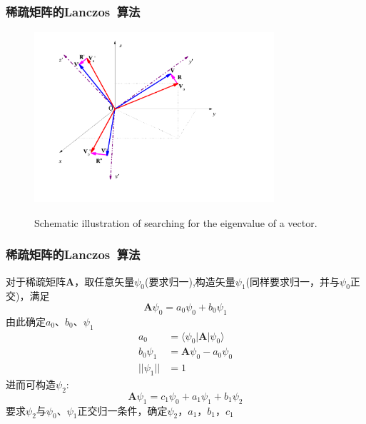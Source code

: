 \documentclass[cjk,slidestop,compress,mathserif,blue]{beamer}
\begin{document}
\frame
{
	\frametitle{稀疏矩阵的\textrm{Lanczos~}算法}
\begin{figure}[h!]
\centering
\includegraphics[height=2.5in,width=3.5in,viewport=0 0 850 590,clip]{Figures/Coordinate_transformation.png}
\label{decent_CG}
\caption{\tiny \textrm{Schematic illustration of searching for the eigenvalue of a vector.}}%
\end{figure}
}

\frame
{
	\frametitle{稀疏矩阵的\textrm{Lanczos~}算法}
	对于稀疏矩阵$\mathbf{A}$，取任意矢量$\psi_0$(要求归一),构造矢量$\psi_1$(同样要求归一，并与$\psi_0$正交)，满足
	\begin{displaymath}
		\mathbf{A}\psi_0=a_0\psi_0+b_0\psi_1
	\end{displaymath}
	由此确定$a_0$、$b_0$、$\psi_1$
	\begin{displaymath}
		\begin{aligned}
			a_0&=\langle\psi_0|\mathbf{A}|\psi_0\rangle\\
			b_0\psi_1&=\mathbf{A}\psi_0-a_0\psi_0\\
			||\psi_1||&=1
		\end{aligned}
	\end{displaymath}
	进而可构造$\psi_2$:
	\begin{displaymath}
		\mathbf{A}\psi_1=c_1\psi_0+a_1\psi_1+b_1\psi_2
	\end{displaymath}
	要求$\psi_2$与$\psi_0$、$\psi_1$正交归一条件，确定$\psi_2$，$a_1$，$b_1$，$c_1$
}
\end{document}
